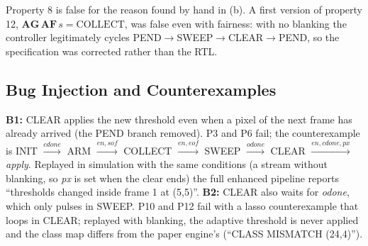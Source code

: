 \documentclass[11pt,a4paper]{article}
\begin{document}
Property 8 is false for the reason found by hand in (b). A first version of property 12, $\mathbf{AG\,AF}\,s{=}\text{COLLECT}$, was
false even with fairness: with no blanking the controller legitimately cycles PEND$\rightarrow$SWEEP$\rightarrow$CLEAR$\rightarrow$PEND,
so the specification was corrected rather than the RTL.

\subsection{Bug Injection and Counterexamples}
\textbf{B1:} CLEAR applies the new threshold even when a pixel of the next frame has already arrived (the PEND branch removed).
P3 and P6 fail; the counterexample is INIT $\xrightarrow{cdone}$ ARM $\xrightarrow{en,sof}$ COLLECT $\xrightarrow{en,eof}$ SWEEP
$\xrightarrow{odone}$ CLEAR $\xrightarrow{en,cdone,px}$ \emph{apply}. Replayed in simulation with the same conditions (a stream without
blanking, so \emph{px} is set when the clear ends) the full enhanced pipeline reports ``thresholds changed inside frame 1 at
(5,5)''. \textbf{B2:} CLEAR also waits for \emph{odone}, which only pulses in SWEEP. P10 and P12 fail with a lasso counterexample
that loops in CLEAR; replayed with blanking, the adaptive threshold is never applied and the class map differs from the paper
engine's (``CLASS MISMATCH (24,4)'').
\end{document}
